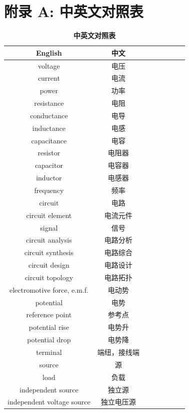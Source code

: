 \documentclass[UTF8]{report}
\theoremstyle{MyLineTheoremStyle} %
\theoremstyle{MyBlockTheoremStyle} %
\theoremstyle{MySubsubsectionStyle} %
\begin{document}
\chapter*{附录 A: 中英文对照表}\thispagestyle{fancy} 
\begin{multicols}{2}  
\begin{table}[H]\centering
\caption{\textbf{中英文对照表}}
\begin{tabular}{cccccccc}\toprule
    English & 中文 \\
    \midrule
    voltage            & 电压 \\
    current            & 电流 \\
    power              & 功率 \\
    resistance         & 电阻 \\
    conductance        & 电导 \\
    inductance         & 电感 \\
    capacitance        & 电容 \\
    resistor           & 电阻器 \\
    capacitor          & 电容器 \\
    inductor           & 电感器 \\
    frequency          & 频率 \\
    circuit            & 电路 \\
    circuit element    & 电流元件 \\
    signal             & 信号 \\
    circuit analysis   & 电路分析 \\
    circuit synthesis  & 电路综合 \\
    circuit design     & 电路设计 \\
    circuit topology   & 电路拓扑 \\
    electromotive force, e.m.f. & 电动势 \\
    potential & 电势 \\
    reference point & 参考点 \\
    potential rise & 电势升 \\
    potential drop & 电势降 \\
    terminal & 端纽，接线端\\ 
    source & 源 \\
    load & 负载 \\
    independent source & 独立源 \\ 
    independent voltage source & 独立电压源 \\ 

\end{tabular}
\end{table}
\end{multicols}
\end{document}
